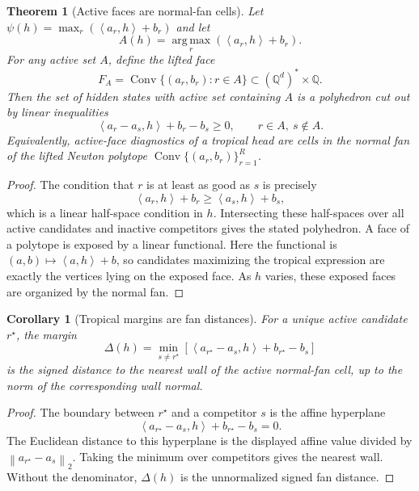 \documentclass[11pt]{article}
\theoremstyle{definition}
\theoremstyle{plain}
\newtheorem{theorem}[definition]{Theorem}
\newtheorem{corollary}[definition]{Corollary}
\theoremstyle{remark}
\numberwithin{equation}{section}
\newcommand{\Q}{\mathbb{Q}}
\newcommand{\argmax}{\operatorname*{arg\,max}}
\newcommand{\Conv}{\operatorname{Conv}}
\newcommand{\norm}[1]{\left\lVert #1\right\rVert}
\newcommand{\ip}[2]{\left\langle #1,#2\right\rangle}
\begin{document}
\begin{theorem}[Active faces are normal-fan cells]
\label{thm:active-normal-fan}
Let $\psi(h)=\max_r(\ip{a_r}{h}+b_r)$ and let
\begin{equation}
  A(h)=\argmax_r(\ip{a_r}{h}+b_r).
\end{equation}
For any active set $A$, define the lifted face
\begin{equation}
  F_A=\Conv\{(a_r,b_r):r\in A\}
  \subset(\Q^d)^\ast\times\Q.
\end{equation}
Then the set of hidden states with active set containing $A$ is a polyhedron cut out by linear inequalities
\begin{equation}
  \ip{a_r-a_s}{h}+b_r-b_s\ge0,
  \qquad r\in A,\ s\notin A.
\end{equation}
Equivalently, active-face diagnostics of a tropical head are cells in the normal fan of the lifted Newton polytope $\Conv\{(a_r,b_r)\}_{r=1}^R$.
\end{theorem}

\begin{proof}
The condition that $r$ is at least as good as $s$ is precisely
\begin{equation}
  \ip{a_r}{h}+b_r\ge \ip{a_s}{h}+b_s,
\end{equation}
which is a linear half-space condition in $h$.  Intersecting these half-spaces over all active candidates and inactive competitors gives the stated polyhedron.  A face of a polytope is exposed by a linear functional.  Here the functional is $(a,b)\mapsto \ip{a}{h}+b$, so candidates maximizing the tropical expression are exactly the vertices lying on the exposed face.  As $h$ varies, these exposed faces are organized by the normal fan.
\end{proof}

\begin{corollary}[Tropical margins are fan distances]
For a unique active candidate $r^\star$, the margin
\begin{equation}
  \Delta(h)=
  \min_{s\ne r^\star}\left[\ip{a_{r^\star}-a_s}{h}+b_{r^\star}-b_s\right]
\end{equation}
is the signed distance to the nearest wall of the active normal-fan cell, up to the norm of the corresponding wall normal.
\end{corollary}

\begin{proof}
The boundary between $r^\star$ and a competitor $s$ is the affine hyperplane
\begin{equation}
  \ip{a_{r^\star}-a_s}{h}+b_{r^\star}-b_s=0.
\end{equation}
The Euclidean distance to this hyperplane is the displayed affine value divided by $\norm{a_{r^\star}-a_s}_2$.  Taking the minimum over competitors gives the nearest wall.  Without the denominator, $\Delta(h)$ is the unnormalized signed fan distance.
\end{proof}
\end{document}
